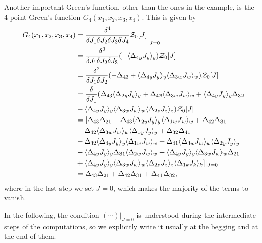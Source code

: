 Another important Green's function, other than the ones in the example, is the 4-point Green's function $G_4(x_1,x_2,x_3,x_4)$. This is given by 
\begin{equation}
    \begin{split}
        G_4(x_1,x_2,x_3,x_4) &= \frac{\delta^4}{\delta J_1\delta J_2\delta J_3\delta J_4}\mathcal{Z}_0[J]\bigg|_{J = 0} \\
        &= \frac{\delta^3}{\delta J_1\delta J_2\delta J_3}(-\langle \Delta_{4y}J_y \rangle_{y})\mathcal{Z}_0[J] \\
        &= \frac{\delta^2}{\delta J_1\delta J_2}(-\Delta_{43} + \langle \Delta_{4y}J_y \rangle_y\langle \Delta_{3w}J_w \rangle_w)\mathcal{Z}_0[J] \\
        &= \frac{\delta}{\delta J_1}(\Delta_{43}\langle \Delta_{2y}J_y \rangle_y + \Delta_{42}\langle \Delta_{3w}J_w \rangle_w + \langle \Delta_{4y}J_y \rangle_y\Delta_{32} \\
        &- \langle \Delta_{4y}J_y \rangle_y\langle \Delta_{3w}J_w \rangle_w\langle \Delta_{2z}J_z \rangle_z)\mathcal{Z}_0[J] \\
        &= [\Delta_{43}\Delta_{21} - \Delta_{43}\langle \Delta_{2y}J_y \rangle_y\langle \Delta_{1w}J_w \rangle_w + \Delta_{42}\Delta_{31} \\
        &- \Delta_{42}\langle \Delta_{3w}J_w \rangle_w\langle \Delta_{1y}J_y \rangle_y + \Delta_{32}\Delta_{41} \\
        &- \Delta_{32}\langle \Delta_{4y}J_y \rangle_y\langle \Delta_{1w}J_w \rangle_w - \Delta_{41}\langle \Delta_{3w}J_w \rangle_w\langle \Delta_{2y}J_y \rangle_y \\
        &- \langle \Delta_{4y}J_y \rangle_y\Delta_{31}\langle \Delta_{2w}J_w \rangle_w - \langle \Delta_{4y}J_y \rangle_y\langle \Delta_{3w}J_w \rangle_w\Delta_{21} \\
        &+ \langle \Delta_{4y}J_y \rangle_y\langle \Delta_{3w}J_w \rangle_w\langle \Delta_{2z}J_z \rangle_z\langle \Delta_{1k}J_k \rangle_k ]|_{J = 0} \\
        &= \Delta_{43}\Delta_{21} + \Delta_{42}\Delta_{31} + \Delta_{41}\Delta_{32},
    \end{split}
\end{equation}
where in the last step we set $J = 0$, which makes the majority of the terms to vanish. 
\begin{notz}
    In the following, the condition $(\cdots)|_{J = 0}$ is understood during the intermediate steps of the computations, so we explicitly write it usually at the begging and at the end of them. 
\end{notz}

